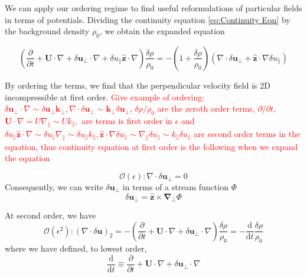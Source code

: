 We can apply our ordering regime to find useful reformulations of particular fields in terms of potentials. Dividing the continuity equation \eqref{eq:Continuity Eqn} by the background density \(\rho_{0}\), we obtain the expanded equation

\begin{equation*}
    \left(\frac{\partial }{\partial t} + \boldsymbol{U} \cdot \nabla + \delta \boldsymbol{u}_{\perp} \cdot \nabla + \delta u_{\parallel} \hat{\boldsymbol{z}}  \cdot \nabla \right) \frac{\delta \rho}{\rho_{0}}= - \left (1 + \frac{\delta \rho}{\rho_{0}}\right)\left(\nabla \cdot \delta \boldsymbol{u}_{\perp} + \hat{\boldsymbol{z}} \cdot \nabla \delta u_{\parallel}\right)
\end{equation*}

By ordering the terms, we find that the perpendicular velocity field is 2D incompressible at first order.
\textcolor{red}{Give example of ordering: \(\delta \boldsymbol{u}_{\perp} \cdot \nabla \sim \delta \boldsymbol{u}_{\perp} \boldsymbol{k_{\perp}}, \nabla \cdot \delta \boldsymbol{u}_{\perp} \sim  \boldsymbol{k_{\perp}}  \delta \boldsymbol{u}_{\perp} \), \(\delta \rho / \rho_{0}\) are the zeroth order terms,  \(\partial / \partial t\), \(\boldsymbol{U} \cdot \nabla= U\nabla_{\parallel}\sim U k_{\parallel}, \) are terms  is first order in \(\epsilon\) and \(\delta u_{\parallel} \hat{\boldsymbol{z}}  \cdot \nabla \sim \delta u_{\parallel} \nabla_{\parallel}  \sim \delta u_{\parallel} k_{\parallel}, \hat{\boldsymbol{z}} \cdot \nabla \delta u_{\parallel} \sim  \nabla_{\parallel} \delta u_{\parallel}  \sim   k_{\parallel} \delta u_{\parallel}\) are second order terms in the equation, thus continuity equation at first order is the following when we expand the equation}

\begin{equation}
    \mathcal{O}(\epsilon): \nabla \cdot \delta \boldsymbol{u}_{\perp} = 0
    \label{eq:incomp u}
\end{equation}
Consequently, we can write \(\delta\boldsymbol{u}_{\perp}\) in terms of a stream function \(\Phi\)
\begin{equation}
    \delta\boldsymbol{u}_{\perp}= \hat{\boldsymbol{z}} \times \boldsymbol{\nabla_{\perp}}\Phi
    \label{eq:Stream}
\end{equation}

At second order, we have 
\begin{equation}
    \mathcal{O}(\epsilon^2): (\nabla \cdot \delta \boldsymbol{u})_{2} = - \left(\frac{\partial }{\partial t} + \boldsymbol{U} \cdot \nabla + \delta \boldsymbol{u}_{\perp} \cdot \nabla \right) \frac{\delta \rho}{\rho_{0}}= -\frac{\mathrm{d}}{\mathrm{d}t} \frac{\delta \rho}{\rho_{0}}
    \label{Continuity 2 order}
\end{equation}
where we have defined, to lowest order, 
\begin{equation*}
    \frac{\mathrm{d}}{\mathrm{d}t} \equiv \frac{\partial}{\partial t} + \boldsymbol{U} \cdot \nabla + \delta \boldsymbol{u}_{\perp} \cdot \nabla
\end{equation*}

